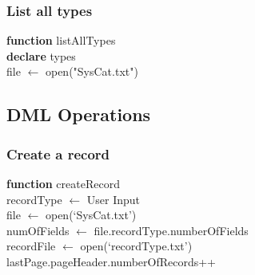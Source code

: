\documentclass[12pt,a4paper]{article}
\begin{document}
        \subsubsection{List all types}
            \IncMargin{1em}
                \begin{algorithm}[H]
                    \SetAlgoLined
                    \textbf{function} listAllTypes \\
                    \textbf{declare} types \\
                     file $\leftarrow$ open("SysCat.txt") \\
                     
                \end{algorithm}
            \DecMargin{1em}
            

    \subsection{DML Operations}
      \subsubsection{Create a record}
            \IncMargin{1em}
                \begin{algorithm}[H]
                    \SetAlgoLined
                    \textbf{function} createRecord \\
                    recordType $\leftarrow$ User Input \\
                    file $\leftarrow$ open(‘SysCat.txt’) \\
                    numOfFields $\leftarrow$ file.recordType.numberOfFields \\
                    recordFile $\leftarrow$ open(‘recordType.txt’) \\
                    lastPage.pageHeader.numberOfRecords++ \\
                     
                \end{algorithm}
            \DecMargin{1em}
\end{document}
